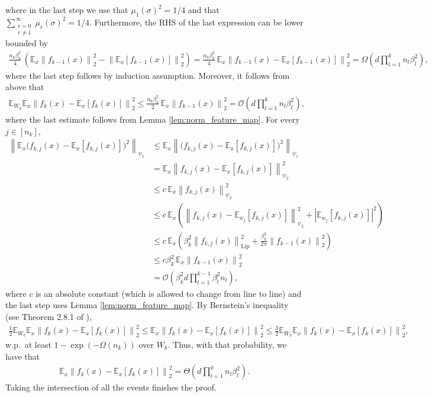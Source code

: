 \documentclass[11pt]{article}
\newcommand{\E}{\mathbb{E}}
\newcommand{\bigO}[1]{\mathcal{O}\left(#1\right)}
\newcommand{\bigOmg}[1]{\Omega\left(#1\right)}
\newcommand{\bigTheta}[1]{\Theta\left(#1\right)}
\newcommand{\bigexp}[1]{\exp\left(#1\right)}
\newcommand{\norm}[1]{\left\|#1\right\|}
\newcommand{\abs}[1]{\left|#1\right|}
\newcommand{\svmax}[1]{\sigma_{\rm max}\left(#1\right)}
\def\Bernstein{Theorem 2.8.1 of \cite{vershynin2018high}}
\def\Lip{\mathrm{Lip}}
\begin{document}
where in the last step we use that $\mu_1(\sigma)^2=1/4$ and that $\sum\limits_{\substack{r=0\\r\neq 1}}^{\infty}	\mu_r(\sigma)^2=1/4$. 
Furthermore, the RHS of the last expression can be lower bounded by
    \begin{align*}
	 \frac{n_k\beta_k^2}{4}\, \left( \E_x\norm{f_{k-1}(x)}_2^2 - \norm{\E_x[f_{k-1}(x)]}_2^2 \right) 
	= \frac{n_k\beta_k^2}{4}\, \E_x\norm{f_{k-1}(x)-\E_x[f_{k-1}(x)]}_2^2 
	=\bigOmg{ d \prod_{l=1}^k n_l\beta_l^2 } ,
    \end{align*}
    where the last step follows by induction assumption.
    Moreover, it follows from above that
    \begin{align*}
	\E_{W_k} \E_x \norm{f_k(x) - \E_{x}[f_k(x)]}_2^2
	\leq \frac{n_k\beta_k^2}{2}\, \E_x\norm{f_{k-1}(x)}_2^2
	= \bigO{ d \prod_{l=1}^k n_l\beta_l^2 } ,
    \end{align*}
    where the last estimate follows from Lemma \ref{lem:norm_feature_map}.
    For every $j\in[n_k],$
    \begin{align*}
	\norm{\E_x \Big(f_{k,j}(x) - \E_{x}[f_{k,j}(x)]\Big)^2}_{\psi_1}
	&\leq \E_x \norm{\Big(f_{k,j}(x) - \E_{x}[f_{k,j}(x)]\Big)^2}_{\psi_1} \\
	&= \E_x \norm{f_{k,j}(x) - \E_{x}[f_{k,j}(x)]}_{\psi_2}^2 \\
	&\le c\, \E_x \norm{f_{k,j}(x)}_{\psi_2}^2 \\
	&\le c \,\E_x \left( \norm{f_{k,j}(x) - \E_{w_j}[f_{k,j}(x)]}_{\psi_2}^2 + \abs{\E_{w_j}[f_{k,j}(x)]}^2 \right)\\
	&\le c \,\E_x \left( \beta_k^2 \norm{f_{k,j}(x)}_{\Lip}^2 + \frac{\beta_k^2}{2\pi} \norm{f_{k-1}(x)}_2^2 \right)\\
	&\le c \beta_k^2\, \E_x \norm{f_{k-1}(x)}_2^2\\
	&= \bigO{ \beta_k^2 d \prod_{l=1}^{k-1} \beta_l^2 n_l },
    \end{align*}
    where $c$ is an absolute constant (which is allowed to change from line to line) and the last step uses Lemma \ref{lem:norm_feature_map}.
    By Bernstein's inequality (see \Bernstein), 
    \begin{align*}
	\frac{1}{2} \E_{W_k} \E_x \norm{f_k(x) - \E_{x}[f_k(x)]}_2^2\le \E_x \norm{f_k(x) - \E_{x}[f_k(x)]}_2^2\le \frac{3}{2} \E_{W_k} \E_x \norm{f_k(x) - \E_{x}[f_k(x)]}_2^2,
    \end{align*}
w.p.\ at least $1-\bigexp{-\bigOmg{n_k}}$ over $W_k.$ Thus, with that probability, we have that     \begin{align*}
	\E_x \norm{f_k(x) - \E_{x}[f_k(x)]}_2^2 
	=\bigTheta{ d \prod_{l=1}^k n_l\beta_l^2 }. 
    \end{align*}
    Taking the intersection of all the events finishes the proof.
\end{document}
